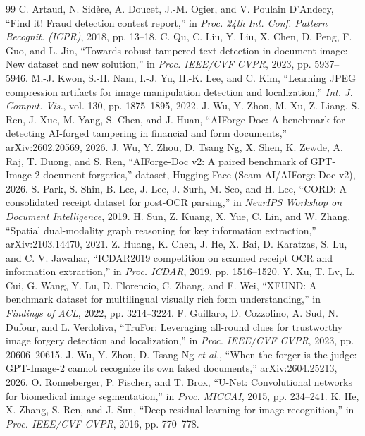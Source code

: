 \documentclass[conference]{IEEEtran}
\begin{document}
\begin{thebibliography}{99}
 C. Artaud, N. Sid\`ere, A. Doucet, J.-M. Ogier, and V. Poulain D'Andecy, ``Find it! Fraud detection contest report,'' in \emph{Proc. 24th Int. Conf. Pattern Recognit. (ICPR)}, 2018, pp. 13--18.
 C. Qu, C. Liu, Y. Liu, X. Chen, D. Peng, F. Guo, and L. Jin, ``Towards robust tampered text detection in document image: New dataset and new solution,'' in \emph{Proc. IEEE/CVF CVPR}, 2023, pp. 5937--5946.
 M.-J. Kwon, S.-H. Nam, I.-J. Yu, H.-K. Lee, and C. Kim, ``Learning JPEG compression artifacts for image manipulation detection and localization,'' \emph{Int. J. Comput. Vis.}, vol. 130, pp. 1875--1895, 2022.
 J. Wu, Y. Zhou, M. Xu, Z. Liang, S. Ren, J. Xue, M. Yang, S. Chen, and J. Huan, ``AIForge-Doc: A benchmark for detecting AI-forged tampering in financial and form documents,'' arXiv:2602.20569, 2026.
 J. Wu, Y. Zhou, D. Tsang Ng, X. Shen, K. Zewde, A. Raj, T. Duong, and S. Ren, ``AIForge-Doc v2: A paired benchmark of GPT-Image-2 document forgeries,'' dataset, Hugging Face (Scam-AI/AIForge-Doc-v2), 2026.
 S. Park, S. Shin, B. Lee, J. Lee, J. Surh, M. Seo, and H. Lee, ``CORD: A consolidated receipt dataset for post-OCR parsing,'' in \emph{NeurIPS Workshop on Document Intelligence}, 2019.
 H. Sun, Z. Kuang, X. Yue, C. Lin, and W. Zhang, ``Spatial dual-modality graph reasoning for key information extraction,'' arXiv:2103.14470, 2021.
 Z. Huang, K. Chen, J. He, X. Bai, D. Karatzas, S. Lu, and C. V. Jawahar, ``ICDAR2019 competition on scanned receipt OCR and information extraction,'' in \emph{Proc. ICDAR}, 2019, pp. 1516--1520.
 Y. Xu, T. Lv, L. Cui, G. Wang, Y. Lu, D. Florencio, C. Zhang, and F. Wei, ``XFUND: A benchmark dataset for multilingual visually rich form understanding,'' in \emph{Findings of ACL}, 2022, pp. 3214--3224.
 F. Guillaro, D. Cozzolino, A. Sud, N. Dufour, and L. Verdoliva, ``TruFor: Leveraging all-round clues for trustworthy image forgery detection and localization,'' in \emph{Proc. IEEE/CVF CVPR}, 2023, pp. 20606--20615.
 J. Wu, Y. Zhou, D. Tsang Ng \emph{et al.}, ``When the forger is the judge: GPT-Image-2 cannot recognize its own faked documents,'' arXiv:2604.25213, 2026.
 O. Ronneberger, P. Fischer, and T. Brox, ``U-Net: Convolutional networks for biomedical image segmentation,'' in \emph{Proc. MICCAI}, 2015, pp. 234--241.
 K. He, X. Zhang, S. Ren, and J. Sun, ``Deep residual learning for image recognition,'' in \emph{Proc. IEEE/CVF CVPR}, 2016, pp. 770--778.

\end{thebibliography}
\end{document}
